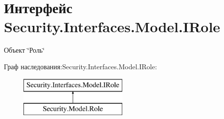 \hypertarget{interface_security_1_1_interfaces_1_1_model_1_1_i_role}{}\section{Интерфейс Security.\+Interfaces.\+Model.\+I\+Role}
\label{interface_security_1_1_interfaces_1_1_model_1_1_i_role}


Объект \char`\"{}Роль\char`\"{}  


Граф наследования\+:Security.\+Interfaces.\+Model.\+I\+Role\+:\begin{figure}[H]
\begin{center}
\leavevmode
\includegraphics[height=2.000000cm]{d7/dcd/interface_security_1_1_interfaces_1_1_model_1_1_i_role}
\end{center}
\end{figure}
